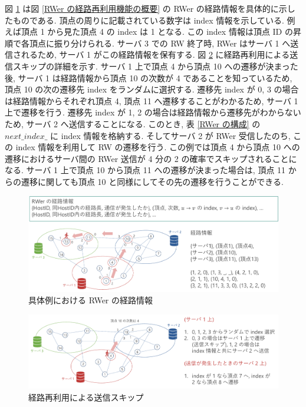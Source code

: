 図 \ref{具体例における RWer の経路情報} は図 \ref{RWer の経路再利用機能の概要} の RWer の経路情報を具体的に示したものである. 頂点の周りに記載されている数字は index 情報を示している. 例えば頂点 1 から見た頂点 4 の index は 1 となる. この index 情報は頂点 ID の昇順で各頂点に振り分けられる. サーバ 3 での RW 終了時, RWer はサーバ 1 へ送信されるため, サーバ 1 がこの経路情報を保有する. 図 \ref{経路再利用による送信スキップ} に経路再利用による送信スキップの詳細を示す. サーバ 1 上で頂点 4 から頂点 10 への遷移が決まった後, サーバ 1 は経路情報から頂点 10 の次数が 4 であることを知っているため, 頂点 10 の次の遷移先 index をランダムに選択する. 遷移先 index が 0, 3 の場合は経路情報からそれぞれ頂点 4, 頂点 11 へ遷移することがわかるため, サーバ 1 上で遷移を行う. 遷移先 index が 1, 2 の場合は経路情報から遷移先がわからないため, サーバ 2 へ送信することになる. このとき, 表 \ref{RWer の構成} の $next\_index\_$ に index 情報を格納する. そしてサーバ 2 が RWer 受信したのち, この index 情報を利用して RW の遷移を行う. この例では頂点 4 から頂点 10 への遷移におけるサーバ間の RWer 送信が 4 分の 2 の確率でスキップされることになる. サーバ 1 上で頂点 10 から頂点 11 への遷移が決まった場合は, 頂点 11 からの遷移に関しても頂点 10 と同様にしてその先の遷移を行うことができる. 

\begin{figure}[t]
    \centering
    \includegraphics[scale=0.5]{figure/path_ex.pdf}
    \caption{具体例における RWer の経路情報}
    \label{具体例における RWer の経路情報}
\end{figure}

\begin{figure}[t]
    \centering
    \includegraphics[scale=0.5]{figure/skip.pdf}
    \caption{経路再利用による送信スキップ}
    \label{経路再利用による送信スキップ}
\end{figure}

